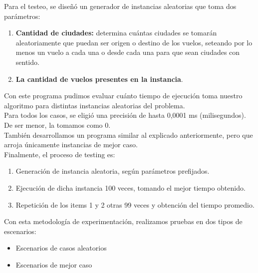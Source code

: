 \noindent Para el testeo, se diseñó un generador de instancias aleatorias que toma dos parámetros:\\


\noindent \begin{enumerate}
\item \textbf{Cantidad de ciudades:} determina cuántas ciudades se tomarán aleatoriamente que puedan ser origen o destino de los vuelos, seteando por lo menos un vuelo a cada una o desde cada una para que sean ciudades con sentido.

\item \textbf{La cantidad de vuelos presentes en la instancia}.\\
\end{enumerate}

\noindent Con este programa pudimos evaluar cuánto tiempo de ejecución toma nuestro algoritmo para distintas instancias aleatorias del problema.\\

\noindent Para todos los casos, se eligió una precisión de hasta 0,0001 ms (milisegundos). De ser menor, la tomamos como 0.\\

\noindent También desarrollamos un programa similar al explicado anteriormente, pero que arroja únicamente instancias de mejor caso.\\

\noindent Finalmente, el proceso de testing es:\\


\noindent \begin{enumerate}
\item Generación de instancia aleatoria, según parámetros prefijados.
\item Ejecución de dicha instancia 100 veces, tomando el mejor tiempo obtenido.
\item Repetición de los items 1 y 2 otras 99 veces y obtención del tiempo promedio.
\end{enumerate}

\noindent Con esta metodología de experimentación, realizamos pruebas en dos tipos de escenarios:\\
\noindent \begin{itemize}
\item Escenarios de casos aleatorios
\item Escenarios de mejor caso\\
\end{itemize}

